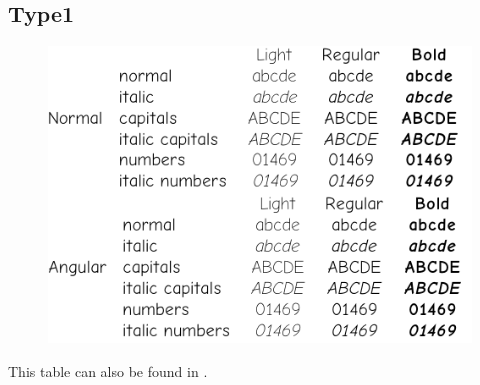 \documentclass[10pt,a4paper,english]{article}
\begin{document}
\subsection{Type1}
\begin{figure}[ht]
	\centering
	\includegraphics[width=.7\textwidth]{comicneue-type1-specimen}
\end{figure}
This table can also be found in .
\end{document}
